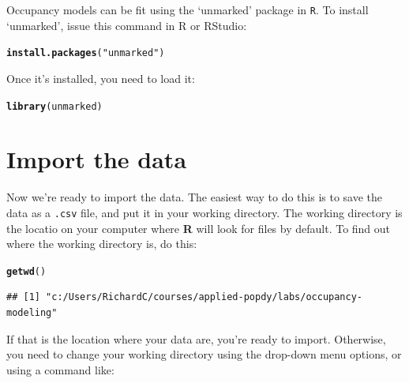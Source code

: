 \documentclass[12pt]{article}\usepackage[]{graphicx}\usepackage[]{color}
\makeatletter
\newcommand{\hlstr}[1]{\textcolor[rgb]{0.192,0.494,0.8}{#1}}%
\newcommand{\hlstd}[1]{\textcolor[rgb]{0.345,0.345,0.345}{#1}}%
\newcommand{\hlkwd}[1]{\textcolor[rgb]{0.737,0.353,0.396}{\textbf{#1}}}%
\newenvironment{kframe}{%
 \def\at@end@of@kframe{}%
 \ifinner\ifhmode%
  \def\at@end@of@kframe{\end{minipage}}%
  \begin{minipage}{\columnwidth}%
 \fi\fi%
 \def\FrameCommand##1{\hskip\@totalleftmargin \hskip-\fboxsep
 \colorbox{shadecolor}{##1}\hskip-\fboxsep
     \hskip-\linewidth \hskip-\@totalleftmargin \hskip\columnwidth}%
 \MakeFramed {\advance\hsize-\width
   \@totalleftmargin\z@ \linewidth\hsize
   \@setminipage}}%
 {\par\unskip\endMakeFramed%
 \at@end@of@kframe}
\newenvironment{knitrout}{}{} %
\makeatother
\begin{document}
Occupancy models can be fit using the `unmarked' package in {\tt R}. To install `unmarked', issue this command in R or RStudio:

\begin{knitrout}
\color{fgcolor}\begin{kframe}
\begin{alltt}
\hlkwd{install.packages}\hlstd{(}\hlstr{"unmarked"}\hlstd{)}
\end{alltt}
\end{kframe}
\end{knitrout}

Once it's installed, you need to load it:

\begin{knitrout}
\color{fgcolor}\begin{kframe}
\begin{alltt}
\hlkwd{library}\hlstd{(unmarked)}
\end{alltt}
\end{kframe}
\end{knitrout}

\section*{Import the data}

Now we're ready to import the data. The easiest way to do this is to save the data as a \texttt{.csv} file, and put it in your working directory. The working directory is the locatio on your computer where {\bf R} will look for files by default. To find out where the working directory is, do this:

\begin{knitrout}
\color{fgcolor}\begin{kframe}
\begin{alltt}
\hlkwd{getwd}\hlstd{()}
\end{alltt}
\begin{verbatim}
## [1] "c:/Users/RichardC/courses/applied-popdy/labs/occupancy-modeling"
\end{verbatim}
\end{kframe}
\end{knitrout}

If that is the location where your data are, you're ready to import. Otherwise, you need to change your working directory using the drop-down menu options, or using a command like:
\end{document}
